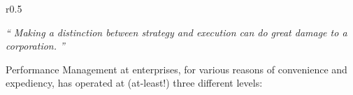 %
%
\pagebreak
{}

\begin{wrapfigure}[3]{r}{0.5\textwidth}
    \vspace{-42pt}
    \begin{center}
        \begin{tcolorbox}[colback=secondary!5,colframe=secondary!60,left=2pt,right=2pt]
            \itshape\large\enquote{%
                Making a distinction between strategy and execution can do great damage to a corporation.%
            }%
            \begin{flushright}\textcite{the_execution_trap}\end{flushright}%
        \end{tcolorbox}
    \end{center}
\end{wrapfigure}

Performance Management at enterprises, for various reasons of convenience and expediency,
has operated at (at-least!) three different levels:

